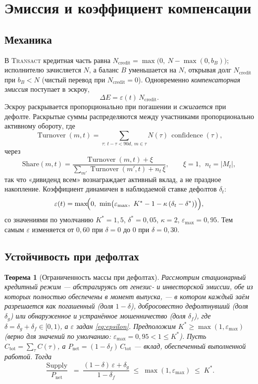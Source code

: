 \documentclass[11pt]{article}
\theoremstyle{plain}
\newtheorem{theorem}{Теорема}
\theoremstyle{definition}
\theoremstyle{remark}
\newcommand{\confidence}{\operatorname{confidence}}
\newcommand{\Supply}{\operatorname{Supply}}
\newcommand{\Turnover}{\operatorname{Turnover}}
\begin{document}
\section{Эмиссия и коэффициент компенсации}\label{sec:emission}

\subsection{Механика}

В \textsc{Transact} кредитная часть равна $N_{\mathrm{credit}} = \max\bigl(0,\ N - \max(0,b_B)\bigr)$; исполнителю зачисляется $N$, а баланс $B$ уменьшается на $N$, открывая долг $N_{\mathrm{credit}}$ при $b_B < N$ (чистый перевод при $N_{\mathrm{credit}}=0$). Одновременно \emph{компенсаторная эмиссия} поступает в эскроу,
\begin{equation}\label{eq:comp}
\Delta E = \varepsilon(t)\, N_{\mathrm{credit}} .
\end{equation}
Эскроу раскрывается пропорционально при погашении и \emph{сжигается} при дефолте. Раскрытые суммы распределяются между участниками пропорционально активному обороту, где
\[
\Turnover(m,t) = \sum_{\tau:\ t-\tau<90d,\ m\in\tau} N(\tau)\,\confidence(\tau),
\]
через
\begin{equation}
\mathrm{Share}(m,t) = \frac{\Turnover(m,t) + \xi}{\sum_{m'}\Turnover(m',t) + n_t\,\xi}, \qquad \xi = 1,\ \ n_t=|M_t|,
\end{equation}
так что «дивиденд всем» вознаграждает активный вклад, а не праздное накопление. Коэффициент динамичен в наблюдаемой ставке дефолтов $\delta_t$:
\begin{equation}\label{eq:epsilon}
\varepsilon(t) = \max\!\Bigl(0,\ \min\bigl(\varepsilon_{\max},\ K^* - 1 - \kappa\,(\delta_t - \delta^*)\bigr)\Bigr),
\end{equation}
со значениями по умолчанию $K^* = 1{,}5$, $\delta^* = 0{,}05$, $\kappa = 2$, $\varepsilon_{\max}=0{,}95$. Тем самым $\varepsilon$ изменяется от $0{,}60$ при $\delta=0$ до $0$ при $\delta = 0{,}30$.

\subsection{Устойчивость при дефолтах}

\begin{theorem}[Ограниченность массы при дефолтах]\label{thm:stability}
Рассмотрим стационарный кредитный режим --- абстрагируясь от генезис- и инвесторской эмиссии, обе из которых полностью обеспечены в момент выпуска, --- в котором каждый заём разрешается как погашенный (доля $1-\delta$), добросовестно дефолтнувший (доля $\delta_g$) или обнаруженное и устранённое мошенничество (доля $\delta_f$), где $\delta=\delta_g+\delta_f\in[0,1)$, а $\varepsilon$ задан \eqref{eq:epsilon}. Предположим $K^*\ge\max(1,\varepsilon_{\max})$ (верно для значений по умолчанию: $\varepsilon_{\max}=0{,}95<1\le K^*$). Пусть $C_{\mathrm{tot}}=\sum_\tau C(\tau)$, а $P_{\mathrm{net}}=(1-\delta_f)\,C_{\mathrm{tot}}$ --- вклад, обеспеченный выполненной работой. Тогда
\[
\frac{\Supply}{P_{\mathrm{net}}} \;=\; \frac{(1-\delta)\,\varepsilon+\delta_g}{1-\delta_f}\;\le\;\max(1,\varepsilon_{\max})\;\le\;K^*.
\]
\end{theorem}
\end{document}
